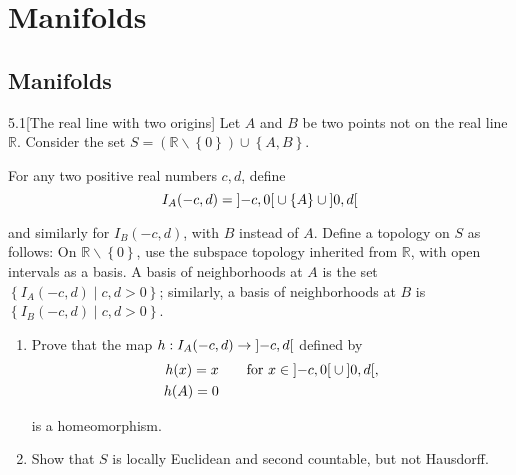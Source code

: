 \chapter{Manifolds}

\section{Manifolds}

\begin{problem}{5.1}[The real line with two origins]
Let \( A \) and \( B \) be two points not on the real line \( \mathbb{R} \). Consider the set \( S = (\mathbb{R} \smallsetminus \left\{0\right\}) \cup \left\{A, B\right\} \).

For any two positive real numbers \( c, d \), define
\[
	I_{A}(-c, d) = \left]{-c, 0}\right[ \cup \left\{A\right\} \cup \left]{0, d}\right[
\]

and similarly for \( I_{B}(-c, d) \), with \( B \) instead of \( A \). Define a topology on \( S \) as follows: On \( \mathbb{R} \smallsetminus \left\{0\right\} \), use the subspace topology inherited from \( \mathbb{R} \), with open intervals as a basis. A basis of neighborhoods at \( A \) is the set \( \left\{ I_{A}(-c, d) \mid c, d > 0 \right\} \); similarly, a basis of neighborhoods at \( B \) is \( \left\{ I_{B}(-c, d) \mid c, d > 0 \right\} \).

\begin{enumerate}[label={(\alph*)}]
	\item Prove that the map \( h: I_{A}(-c,d) \to \left]{-c, d}\right[ \) defined by
	      \begin{align*}
		      h(x) = x & \qquad \text{for \( x \in \left]{-c, 0}\right[ \cup \left]{0, d}\right[ \)}, \\
		      h(A) = 0
	      \end{align*}

	      is a homeomorphism.
	\item Show that \( S \) is locally Euclidean and second countable, but not Hausdorff.
\end{enumerate}
\end{problem}

